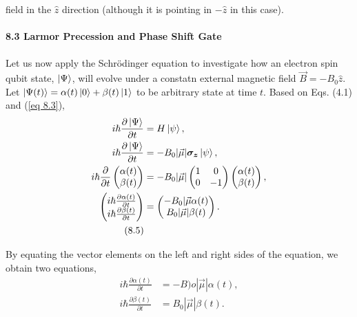 \documentclass{article}
\begin{document}
field in the $\hat{z}$ direction (although it is pointing in $-\hat{z}$ in this case).\\\\
\textbf{\large 8.3 Larmor Precession and Phase Shift Gate}\\\\
Let us now apply the Schr\"{o}dinger equation to investigate how an electron spin qubit
state, $\ket{\Psi}$, will evolve under a constatn external magnetic field $\vec{B}=-B_0\hat{z}$.
Let $\ket{\Psi(t)}=\alpha(t)\ket{0}+\beta(t)\ket{1}$ to be arbitrary state at time $t$.
Based on Eqs. (4.1) and (\ref{eq 8.3}),
\begin{align*} \label{eq 8.5}
    i\hbar\frac{\partial \ket{\Psi}}{\partial t}&=H\ket{\psi},\\
    i\hbar\frac{\partial \ket{\Psi}}{\partial t}&=-B_0|\vec{\mu}|\boldsymbol{\sigma_z}\ket{\psi},\\
    i\hbar\frac{\partial}{\partial t}\begin{pmatrix}
        \alpha(t)\\ \beta(t)
    \end{pmatrix}&=-B_0|\vec{\mu}|\begin{pmatrix}
        1&0\\0&-1
    \end{pmatrix}
    \begin{pmatrix}
        \alpha(t)\\ \beta(t)
    \end{pmatrix},\\
    \begin{pmatrix}
        i\hbar\frac{\partial\alpha(t)}{\partial t}\\
        i\hbar\frac{\partial\beta(t)}{\partial t}
    \end{pmatrix}&=\begin{pmatrix}
        -B_0|\vec{\mu}\alpha(t)\\
        B_0|\vec{\mu}|\beta(t)
    \end{pmatrix}.\\ \tag{8.5}
\end{align*}

By equating the vector elements on the left and right sides of the equation, we obtain
two equations,
\begin{align*}
    \label{eq 8.6} i\hbar\frac{\partial\alpha(t)}{\partial t}&= -B)o|\vec{\mu}|\alpha (t), \tag{8.6}\\
    \label{eq 8.7} i\hbar\frac{\partial \beta(t)}{\partial t}&= B_0|\vec{\mu}|\beta(t).\tag{8.7}\\
\end{align*}
\end{document}
